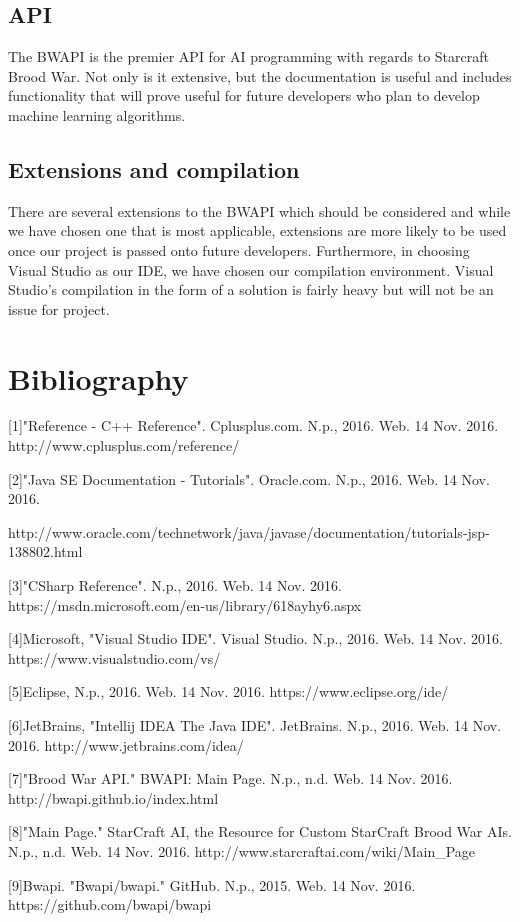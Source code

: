 \documentclass[10pt,letterpaper,onecolumn,draftclsnofoot]{IEEEtran}
\begin{document}
\subsection{API}
The BWAPI is the premier API for AI programming with regards to Starcraft Brood War. Not only is it extensive, but the documentation is useful and includes functionality that will prove useful for future developers who plan to develop machine learning algorithms.

\subsection{Extensions and compilation}
There are several extensions to the BWAPI which should be considered and while we have chosen one that is most applicable, extensions are more likely to be used once our project is passed onto future developers. Furthermore, in choosing Visual Studio as our IDE, we have chosen our compilation environment. Visual Studio's compilation in the form of a solution is fairly heavy but will not be an issue for project.


\newpage

\section{Bibliography}
[1]"Reference - C++ Reference". Cplusplus.com. N.p., 2016. Web. 14 Nov. 2016. http://www.cplusplus.com/reference/

[2]"Java SE Documentation - Tutorials". Oracle.com. N.p., 2016. Web. 14 Nov. 2016.

http://www.oracle.com/technetwork/java/javase/documentation/tutorials-jsp-138802.html

[3]"CSharp Reference". N.p., 2016. Web. 14 Nov. 2016. https://msdn.microsoft.com/en-us/library/618ayhy6.aspx

[4]Microsoft, "Visual Studio IDE". Visual Studio. N.p., 2016. Web. 14 Nov. 2016. https://www.visualstudio.com/vs/

[5]Eclipse, N.p., 2016. Web. 14 Nov. 2016. https://www.eclipse.org/ide/

[6]JetBrains, "Intellij IDEA The Java IDE". JetBrains. N.p., 2016. Web. 14 Nov. 2016. http://www.jetbrains.com/idea/

[7]"Brood War API." BWAPI: Main Page. N.p., n.d. Web. 14 Nov. 2016. http://bwapi.github.io/index.html

[8]"Main Page." StarCraft AI, the Resource for Custom StarCraft Brood War AIs. N.p., n.d. Web. 14 Nov. 2016. http://www.starcraftai.com/wiki/Main\_Page

[9]Bwapi. "Bwapi/bwapi." GitHub. N.p., 2015. Web. 14 Nov. 2016.  https://github.com/bwapi/bwapi
\end{document}

